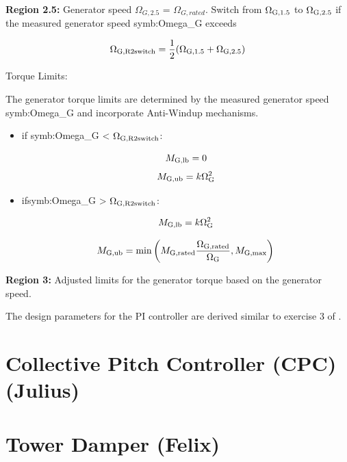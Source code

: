 \textbf{Region 2.5:} Generator speed $\Omega_{G,2.5}$ = $\Omega_{G,rated}$.
Switch from $\Omega_{\textnormal{G,1.5}}$ to $\Omega_{\textnormal{G,2.5}}$ if the measured generator speed \gls{symb:Omega_G} exceeds 

\begin{equation}
	\Omega_{\textnormal{G,R2switch}} = \frac{1}{2} (\Omega_{\textnormal{G,1.5}} + \Omega_{\textnormal{G,2.5}})
	\label{equation:Omega_Region_2.5}
\end{equation}

Torque Limits: 

The generator torque limits are determined by the measured generator speed \gls{symb:Omega_G} and incorporate Anti-Windup mechanisms.

\begin{itemize}
	
	\item if \gls{symb:Omega_G} < $\Omega_{\textnormal{G,R2switch}}$:
	
	\begin{equation}
		M_{\textnormal{G,lb}} = 0
		\label{equation:MG,lb}
	\end{equation}
	\begin{equation}
		M_{\textnormal{G,ub}} = k \Omega_{\textnormal{G}}^2
		\label{equation:MG,ub}
	\end{equation}
	
	\item if\gls{symb:Omega_G} > $\Omega_{\textnormal{G,R2switch}}$:
	
	\begin{equation}
		M_{\textnormal{G,lb}} = k \Omega_{\textnormal{G}}^2
		\label{equation:MG,lb,2}
	\end{equation}
	
	\begin{equation} 
		M_{\textnormal{G,ub}} = \min\left(M_{\textnormal{G,{rated}}}\frac{\Omega_{\textnormal{G,{rated}}}}{\Omega_{\textnormal{G}}}, M_{\textnormal{G,max}}\right)
		\label{equation:MG,ub,2}
	\end{equation}
	
\end{itemize}

\textbf{Region 3:} Adjusted limits for the generator torque based on the generator speed.

The design parameters for the PI controller are derived similar to exercise 3 of \cite{SchlipfLecture}.

\section{Collective Pitch Controller (CPC) (Julius)}


\section{Tower Damper (Felix)}

